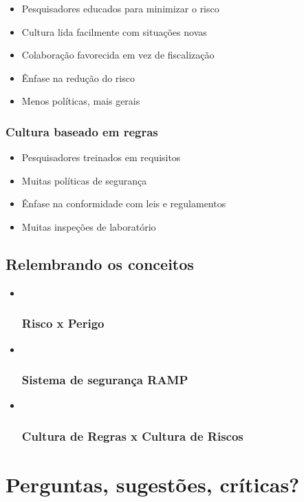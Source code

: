 \documentclass[
  letterpaper,
  DIV=11,
  numbers=noendperiod]{scrartcl}
\providecommand{\tightlist}{%
  \setlength{\itemsep}{0pt}\setlength{\parskip}{0pt}}\usepackage{longtable,booktabs,array}
\begin{document}
\begin{itemize}
\tightlist
\item
  Pesquisadores educados para minimizar o risco
\item
  Cultura lida facilmente com situações novas
\item
  Colaboração favorecida em vez de fiscalização
\item
  Ênfase na redução do risco
\item
  Menos políticas, mais gerais
\end{itemize}

\subsubsection{Cultura baseado em
regras}\label{cultura-baseado-em-regras}

\begin{itemize}
\tightlist
\item
  Pesquisadores treinados em requisitos
\item
  Muitas políticas de segurança
\item
  Ênfase na conformidade com leis e regulamentos
\item
  Muitas inspeções de laboratório
\end{itemize}

\subsection{Relembrando os conceitos}\label{relembrando-os-conceitos}

\begin{itemize}
\item ~
  \subsubsection{Risco x Perigo}\label{risco-x-perigo}
\item ~
  \subsubsection{Sistema de segurança
  RAMP}\label{sistema-de-seguranuxe7a-ramp}
\item ~
  \subsubsection{Cultura de Regras x Cultura de
  Riscos}\label{cultura-de-regras-x-cultura-de-riscos}
\end{itemize}

\section{Perguntas, sugestões,
críticas?}\label{perguntas-sugestuxf5es-cruxedticas}
\end{document}

